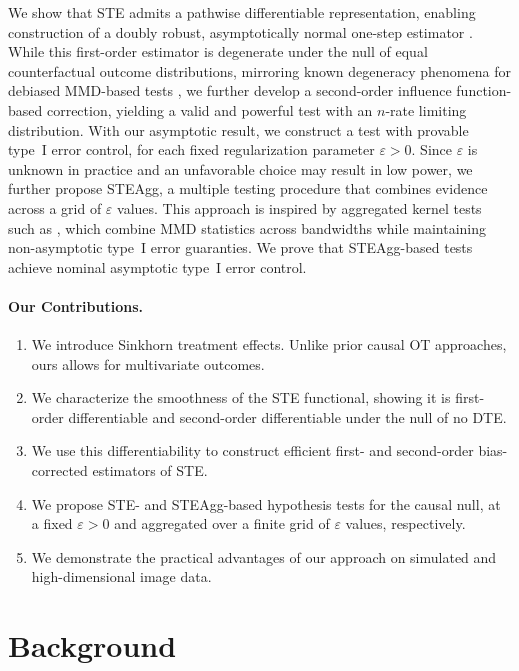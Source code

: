 \documentclass{article}
\theoremstyle{plain}
\theoremstyle{definition}
\theoremstyle{remark}
\newcommand{\1}{\mathbbm{1}}
\newcommand{\eps}{\varepsilon}
\theoremstyle{plain}
\theoremstyle{definition}
\begin{document}
We show that STE admits a pathwise differentiable representation, enabling construction of a doubly robust, asymptotically normal one-step estimator \cite{pfanzagl1982lecture}. While this first-order estimator is degenerate under the null of equal counterfactual outcome distributions, mirroring known degeneracy phenomena for debiased MMD-based tests \cite{muandet2017kernel}, we further develop a second-order influence function-based correction, yielding a valid and powerful test with an $n$-rate limiting distribution. 
With our asymptotic result, we construct a test with provable type~I error control, for each fixed regularization parameter $\eps > 0$. Since $\eps$ is unknown in practice and an unfavorable choice may result in low power, we further propose STEAgg, a multiple testing procedure that combines evidence across a grid of $\eps$ values. This approach is inspired by aggregated kernel tests such as \citet{schrab2023mmd}, which combine MMD statistics across bandwidths while maintaining non-asymptotic type~I error guaranties. We prove that STEAgg-based tests achieve nominal asymptotic type~I error control.

\paragraph{Our Contributions.}
\begin{enumerate}

    \item We introduce Sinkhorn treatment effects. Unlike prior causal OT approaches, ours allows for multivariate outcomes.
    \item We characterize the smoothness of the STE functional, showing it is first-order differentiable and second-order differentiable under the null of no DTE.
    \item We use this differentiability to construct efficient first- and second-order bias-corrected estimators of STE.
    \item We propose STE- and STEAgg-based hypothesis tests for the causal null, at a fixed $\eps>0$ and aggregated over a finite grid of $\eps$ values, respectively.  
    \item We demonstrate the practical advantages of our approach on simulated and high-dimensional image data.
\end{enumerate}



\section{Background}\label{sec:background}
\end{document}
